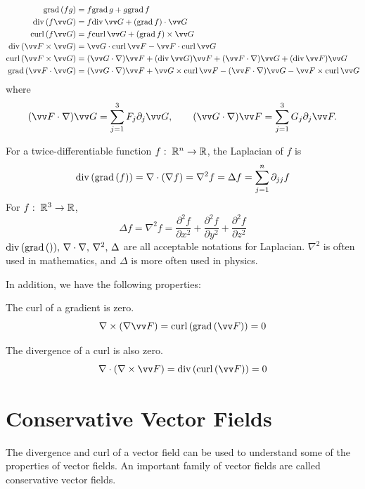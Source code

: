 \begin{theorem}
$$
\begin{aligned}
\Grad (fg) &= f \Grad g + g \Grad f  \\
\Div (f\vv G) &= f\Div \vv G + (\Grad f) \cdot \vv G   \\
\Curl (f\vv G) &= f \Curl \vv G +(\Grad f) \times \vv G \\
\Div(\vv F\times \vv G)&= \vv G\cdot \Curl \vv F - \vv F\cdot \Curl \vv G\\
\Curl(\vv F\times \vv G)&=
(\vv G\cdot \nabla)\vv F + (\Div \vv G)\vv F+
(\vv F\cdot \nabla)\vv G + (\Div  \vv F) \vv G \\
\Grad(\vv F\cdot \vv G) &=
(\vv G\cdot \nabla)\vv F + \vv G\times \Curl \vv F -
(\vv F\cdot \nabla)\vv G - \vv F\times \Curl \vv G 
\end{aligned}
$$
where
$$
(\vv F\cdot \nabla)\vv G = \sum_{j=1}^3 F_j \partial_j \vv G,
\qquad 
(\vv G\cdot \nabla)\vv F = \sum_{j=1}^3 G_j \partial_j \vv F.
$$
\end{theorem}

\begin{definition}[Laplacian]
For a twice-differentiable function $f:\; {\mathbb R}^n \to {\mathbb R}$, the Laplacian of $f$ is
$$
\mathrm{div\,}(\mathrm{grad\,}(f)) = \nabla \cdot (\nabla f) = \nabla^2 f = \Delta f = \sum_{j=1}^n \partial_{jj}f
$$
For $f:\; {\mathbb R}^3 \to {\mathbb R}$,
$$
\Delta f = \nabla^2 f = \frac{\partial^2 f}{\partial x^2} + \frac{\partial^2 f}{\partial y^2} + \frac{\partial^2 f}{\partial z^2}
$$
$\mathrm{div\,}(\mathrm{grad\,}()),\, \nabla \cdot \nabla,\, \nabla^2,\, \Delta$ are all acceptable notations for Laplacian. $\nabla^2$ is often used in mathematics, and $\Delta$ is more often used in physics.
\end{definition}

In addition, we have the following properties:

The curl of a gradient is zero.
$$
\nabla \times (\nabla \vv F) = \Curl(\Grad(\vv F)) = 0
$$

The divergence of a curl is also zero.
$$
\nabla \cdot (\nabla \times \vv F) = \Div(\Curl(\vv F)) = 0
$$

\section{Conservative Vector Fields}

The divergence and curl of a vector field can be used to understand some of the properties of vector fields. An important family of vector fields are called conservative vector fields.

